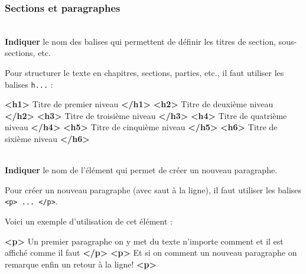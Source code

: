 \documentclass[a4paper,17pt]{extarticle}
\newenvironment{eleve}%
{\begin{activite}\color{noiramu}\\}
{\end{activite}}
\newenvironment{Shaded}{}{}
\newcommand{\KeywordTok}[1]{\textcolor[rgb]{0.00,0.44,0.13}{\textbf{{#1}}}}
\newcommand{\NormalTok}[1]{{#1}}
\begin{document}
    \hypertarget{sections-et-paragraphes}{%
\subsubsection{Sections et paragraphes}\label{sections-et-paragraphes}}
\begin{eleve}
    \textbf{Indiquer} le nom des balises qui permettent de définir les
titres de section, sous-sections, etc.
        
        \end{eleve}\begin{reponse}
    Pour structurer le texte en chapitres, sections, parties, etc., il faut
utiliser les balises \texttt{h...} :

\begin{Shaded}
\begin{Highlighting}[]
\KeywordTok{<h1>}\NormalTok{ Titre de premier niveau }\KeywordTok{</h1>}
\KeywordTok{<h2>}\NormalTok{ Titre de deuxième niveau }\KeywordTok{</h2>}
\KeywordTok{<h3>}\NormalTok{ Titre de troisième niveau }\KeywordTok{</h3>}
\KeywordTok{<h4>}\NormalTok{ Titre de quatrième niveau }\KeywordTok{</h4>}
\KeywordTok{<h5>}\NormalTok{ Titre de cinquième niveau }\KeywordTok{</h5>}
\KeywordTok{<h6>}\NormalTok{ Titre de sixième niveau }\KeywordTok{</h6>}
\end{Highlighting}
\end{Shaded}

            \end{reponse}\begin{eleve}
    \textbf{Indiquer} le nom de l'élément qui permet de créer un nouveau
paragraphe.
        
        \end{eleve}\begin{reponse}
    Pour créer un nouveau paragraphe (avec saut à la ligne), il faut
utiliser les balises
\texttt{\textless{}p\textgreater{}\ ...\ \textless{}/p\textgreater{}}.

Voici un exemple d'utilisation de cet élément :

\begin{Shaded}
\begin{Highlighting}[]
\KeywordTok{<p>}\NormalTok{ Un premier paragraphe}
\NormalTok{    on y met}
\NormalTok{    du texte   n'importe comment}
\NormalTok{    et il est affiché comme}
\NormalTok{    il }
\NormalTok{    faut }\KeywordTok{</p>}
\KeywordTok{<p>}\NormalTok{ Et si on comment un nouveau paragraphe}
\NormalTok{    on remarque enfin un retour à la ligne! }\KeywordTok{<p>}
\end{Highlighting}
\end{Shaded}

            \end{reponse}
\end{document}

